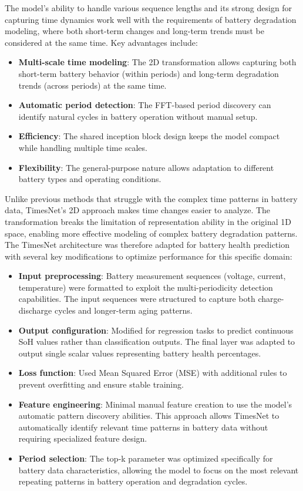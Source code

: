 The model's ability to handle various sequence lengths and its strong design for capturing time dynamics work well with the requirements of battery degradation modeling, where both short-term changes and long-term trends must be considered at the same time. Key advantages include:

\begin{itemize}
\item \textbf{Multi-scale time modeling}: The 2D transformation allows capturing both short-term battery behavior (within periods) and long-term degradation trends (across periods) at the same time.
\item \textbf{Automatic period detection}: The FFT-based period discovery can identify natural cycles in battery operation without manual setup.
\item \textbf{Efficiency}: The shared inception block design keeps the model compact while handling multiple time scales.
\item \textbf{Flexibility}: The general-purpose nature allows adaptation to different battery types and operating conditions.
\end{itemize}

Unlike previous methods that struggle with the complex time patterns in battery data, TimesNet's 2D approach makes time changes easier to analyze. The transformation breaks the limitation of representation ability in the original 1D space, enabling more effective modeling of complex battery degradation patterns. The TimesNet architecture was therefore adapted for battery health prediction with several key modifications to optimize performance for this specific domain:

\begin{itemize}
    \item \textbf{Input preprocessing}: Battery measurement sequences (voltage, current, temperature) were formatted to exploit the multi-periodicity detection capabilities. The input sequences were structured to capture both charge-discharge cycles and longer-term aging patterns.
    \item \textbf{Output configuration}: Modified for regression tasks to predict continuous SoH values rather than classification outputs. The final layer was adapted to output single scalar values representing battery health percentages.
    \item \textbf{Loss function}: Used Mean Squared Error (MSE) with additional rules to prevent overfitting and ensure stable training.
    \item \textbf{Feature engineering}: Minimal manual feature creation to use the model's automatic pattern discovery abilities. This approach allows TimesNet to automatically identify relevant time patterns in battery data without requiring specialized feature design.
    \item \textbf{Period selection}: The top-k parameter was optimized specifically for battery data characteristics, allowing the model to focus on the most relevant repeating patterns in battery operation and degradation cycles.
\end{itemize}

